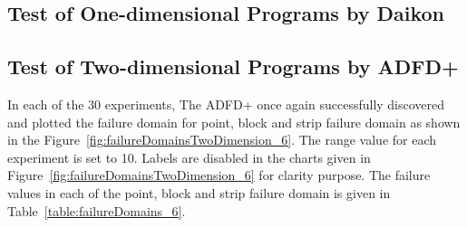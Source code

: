 


\subsection{Test of One-dimensional Programs by Daikon}










\subsection{Test of Two-dimensional Programs by ADFD+}\label{sec:intro6_11}
In each of the 30 experiments, The ADFD+ once again successfully discovered and plotted the failure domain for point, block and strip failure domain as shown in the Figure~\ref{fig:failureDomainsTwoDimension_6}. The range value for each experiment is set to 10. Labels are disabled in the charts given in Figure~\ref{fig:failureDomainsTwoDimension_6} for clarity purpose. The failure values in each of the point, block and strip failure domain is given in Table~\ref{table:failureDomains_6}. 

